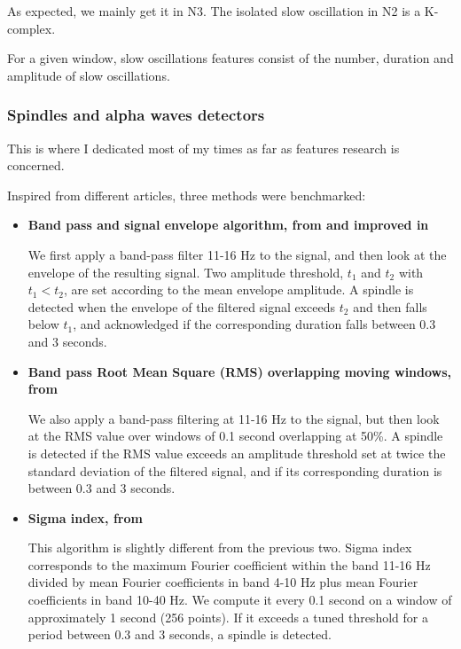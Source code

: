 \documentclass[12pt]{report}
\begin{document}
As expected, we mainly get it in N3. The isolated slow oscillation in N2 is a K-complex.

For a given window, slow oscillations features consist of the number, duration and amplitude of slow oscillations.


\subsubsection{Spindles and alpha waves detectors}

This is where I dedicated most of my times as far as features research is concerned.

Inspired from different articles, three methods were benchmarked:
\begin{itemize}
\item \textbf{Band pass and signal envelope algorithm, from \cite{ferrarelli2007reduced} and improved in \cite{astill2014sleep}}

We first apply a band-pass filter 11-16 Hz to the signal, and then look at the envelope of the resulting signal. Two amplitude threshold, $t_1$ and $t_2$ with $t_1 < t_2$, are set according to the mean envelope amplitude. A spindle is detected when the envelope of the filtered signal exceeds $t_2$ and then falls below $t_1$, and acknowledged if the corresponding duration falls between 0.3 and 3 seconds.

\item \textbf{Band pass Root Mean Square (RMS) overlapping moving windows, from \cite{molle2002grouping}}

We also apply a band-pass filtering at 11-16 Hz to the signal, but then look at the RMS value over windows of 0.1 second overlapping at 50\%. A spindle is detected if the RMS value exceeds an amplitude threshold set at twice the standard deviation of the filtered signal, and if its corresponding duration is between 0.3 and 3 seconds.

\item \textbf{Sigma index, from \cite{huupponen2007development}}

This algorithm is slightly different from the previous two. Sigma index corresponds to the maximum Fourier coefficient within the band 11-16 Hz divided by mean Fourier coefficients in band 4-10 Hz plus mean Fourier coefficients in band 10-40 Hz. We compute it every 0.1 second on a window of approximately 1 second (256 points). If it exceeds a tuned threshold for a period between 0.3 and 3 seconds, a spindle is detected.
\end{itemize}
\end{document}
